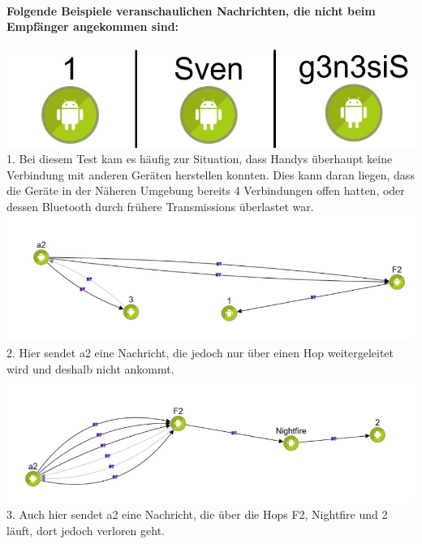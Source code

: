 \paragraph*{Folgende Beispiele veranschaulichen Nachrichten, die nicht beim
Empfänger angekommen sind:}
\includegraphics[width=1.0\textwidth]{belege/grosstests/Bilder/Grosstest2/Test1Misserfolg2.jpg}\\
1. Bei diesem Test kam es häufig zur Situation, dass Handys überhaupt keine
Verbindung mit anderen Geräten herstellen konnten. Dies kann daran
liegen, dass die Geräte in der Näheren Umgebung bereits 4 Verbindungen
offen hatten, oder dessen Bluetooth durch frühere Transmissions
überlastet war.\\

\includegraphics[width=1.0\textwidth]{belege/grosstests/Bilder/Grosstest2/Test1Misserfolg1.jpg}\\
2. Hier sendet a2 eine Nachricht, die jedoch nur über einen Hop
weitergeleitet wird und deshalb nicht ankommt.\\
\includegraphics[width=1.0\textwidth]{belege/grosstests/Bilder/Grosstest2/Test1Misserfolg3.jpg}\\
3. Auch hier sendet a2 eine Nachricht, die über die Hops F2, Nightfire und
2 läuft, dort jedoch verloren geht.\\

